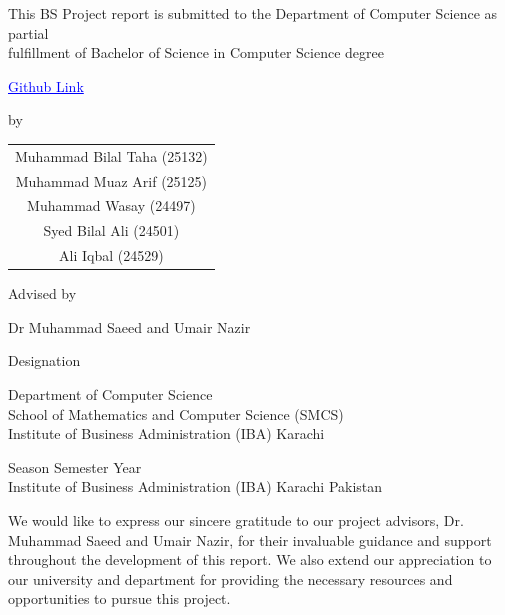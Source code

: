 \documentclass{bscs}
\begin{document}
\begin{titlepage}
\vspace{1.5cm}

This BS Project report is submitted to the Department of Computer Science as partial\\
fulfillment of Bachelor of Science in Computer Science degree

\vspace{0.5cm}

\textcolor{blue}{\underline{Github Link}}

\vspace{2cm}

by

\vspace{1cm}

\begin{tabular}{c}
Muhammad Bilal Taha (25132) \\
Muhammad Muaz Arif (25125) \\
Muhammad Wasay (24497) \\
Syed Bilal Ali (24501) \\
Ali Iqbal (24529)
\end{tabular}

\vspace{2cm}

Advised by

\vspace{0.5cm}

Dr Muhammad Saeed and Umair Nazir

\vspace{0.5cm}

Designation

\vspace{0.5cm}

Department of Computer Science\\
School of Mathematics and Computer Science (SMCS)\\
Institute of Business Administration (IBA) Karachi

\vspace{3cm}

Season Semester Year\\
Institute of Business Administration (IBA) Karachi Pakistan

\end{titlepage}

\frontmatter

\begin{acknowledgement}
We would like to express our sincere gratitude to our project advisors, Dr. Muhammad Saeed and 
Umair Nazir, for their invaluable guidance and support throughout the development of this 
report. We also extend our appreciation to our university and department for providing the 
necessary resources and opportunities to pursue this project. 
\end{acknowledgement}
\end{document}
